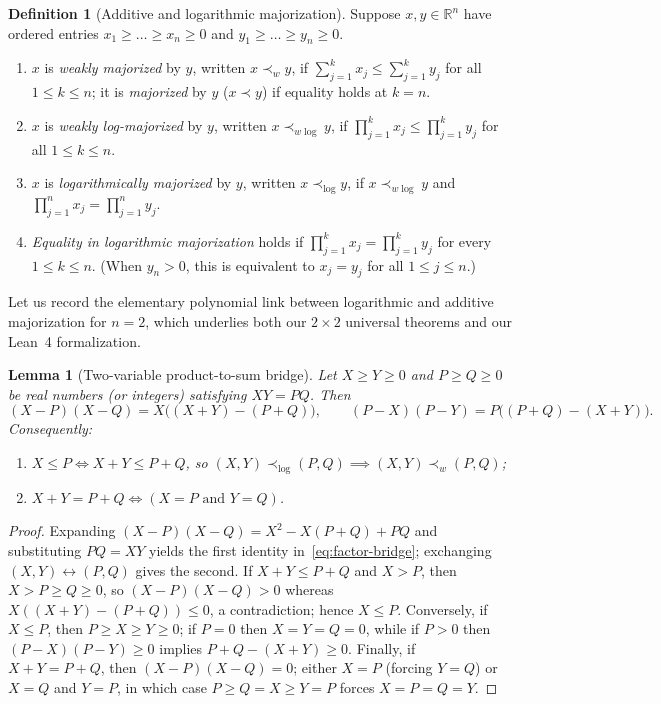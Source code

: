\documentclass[11pt,a4paper]{article}
\newtheorem{lemma}[theorem]{Lemma}
\theoremstyle{definition}
\newtheorem{definition}[theorem]{Definition}
\newcommand{\R}{\mathbb{R}}
\begin{document}
\begin{definition}[Additive and logarithmic majorization]\label{def:majorization}
Suppose $x, y \in \R^n$ have ordered entries $x_1 \ge \dots \ge x_n \ge 0$ and $y_1 \ge \dots \ge y_n \ge 0$.
\begin{enumerate}
  \item[(a)] $x$ is \emph{weakly majorized} by $y$, written $x \prec_w y$, if $\sum_{j=1}^k x_j \le \sum_{j=1}^k y_j$ for all $1 \le k \le n$; it is \emph{majorized} by $y$ ($x \prec y$) if equality holds at $k = n$.
  \item[(b)] $x$ is \emph{weakly log-majorized} by $y$, written $x \prec_{w\log} y$, if $\prod_{j=1}^k x_j \le \prod_{j=1}^k y_j$ for all $1 \le k \le n$.
  \item[(c)] $x$ is \emph{logarithmically majorized} by $y$, written $x \prec_{\log} y$, if $x \prec_{w\log} y$ and $\prod_{j=1}^n x_j = \prod_{j=1}^n y_j$.
  \item[(d)] \emph{Equality in logarithmic majorization} holds if $\prod_{j=1}^k x_j = \prod_{j=1}^k y_j$ for every $1 \le k \le n$. (When $y_n > 0$, this is equivalent to $x_j = y_j$ for all $1 \le j \le n$.)
\end{enumerate}
\end{definition}

Let us record the elementary polynomial link between logarithmic and additive majorization for $n = 2$, which underlies both our $2\times 2$ universal theorems and our Lean~4 formalization.

\begin{lemma}[Two-variable product-to-sum bridge]\label{lem:pair-bridge}
Let $X \ge Y \ge 0$ and $P \ge Q \ge 0$ be real numbers (or integers) satisfying $XY = PQ$. Then
\begin{equation}\label{eq:factor-bridge}
  (X - P)(X - Q) = X\bigl((X + Y) - (P + Q)\bigr),
  \qquad
  (P - X)(P - Y) = P\bigl((P + Q) - (X + Y)\bigr).
\end{equation}
Consequently:
\begin{enumerate}
  \item[(i)] $X \le P \iff X + Y \le P + Q$, so $(X, Y) \prec_{\log} (P, Q) \implies (X, Y) \prec_w (P, Q)$;
  \item[(ii)] $X + Y = P + Q \iff (X = P \text{ and } Y = Q)$.
\end{enumerate}
\end{lemma}

\begin{proof}
Expanding $(X - P)(X - Q) = X^2 - X(P + Q) + PQ$ and substituting $PQ = XY$ yields the first identity in~\eqref{eq:factor-bridge}; exchanging $(X, Y) \leftrightarrow (P, Q)$ gives the second. If $X + Y \le P + Q$ and $X > P$, then $X > P \ge Q \ge 0$, so $(X - P)(X - Q) > 0$ whereas $X((X + Y) - (P + Q)) \le 0$, a contradiction; hence $X \le P$. Conversely, if $X \le P$, then $P \ge X \ge Y \ge 0$; if $P = 0$ then $X = Y = Q = 0$, while if $P > 0$ then $(P - X)(P - Y) \ge 0$ implies $P + Q - (X + Y) \ge 0$. Finally, if $X + Y = P + Q$, then $(X - P)(X - Q) = 0$; either $X = P$ (forcing $Y = Q$) or $X = Q$ and $Y = P$, in which case $P \ge Q = X \ge Y = P$ forces $X = P = Q = Y$.
\end{proof}
\end{document}
